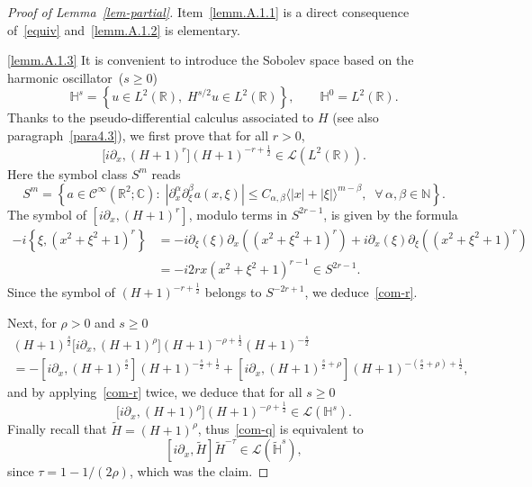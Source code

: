 \documentclass[AHL,Unicode,published]{cedram}
\newcommand{\C}{\mathbb{C}}
\newcommand{\R}{\mathbb{R}}
\newcommand{\HH}{\mathbb{H}}
\newcommand{\N}{\mathbb{N}}
\newcommand{\clL}{\mathcal{L}}
\newcommand{\clC}{\mathcal{C}}
\newcommand{\wt}{\widetilde}
\newcommand{\<}{\langle}
\renewcommand{\>}{\rangle}
\let\oldforall\forall
\renewcommand*{\forall}{\mathrel{\oldforall}}
\newcommand{\R}{\mathbb{R}}
\begin{document}
\begin{proof}[Proof of Lemma~\ref{lem-partial}]
Item~\eqref{lemm.A.1.1}  is a direct consequence of~\eqref{equiv} and~\eqref{lemm.A.1.2} is elementary.

\eqref{lemm.A.1.3}  It is convenient to introduce the Sobolev space based on the harmonic oscillator~($s\geq 0$)
\[
{\HH}^{s} = \left\{ u\in L^2(\R),\; H^{s/2}u\in L^2(\R)\right\}, \qquad {\HH}^{0} =L^2(\R).
\]
Thanks to the pseudo-differential calculus associated to $H$ (see also paragraph~\ref{para4.3}), we first prove that for all $r>0$,
\begin{equation}\label{com-r}
\big[i \partial_x, (H+1)^r\big] (H+1)^{-r+\frac12} \in \clL\left(L^2(\R)\right).
\end{equation}
Here the symbol class $S^m$ reads
\[
S^m =\left\{ a \in \clC^\infty\left(\R^2; \C\right) : \; \left|\partial_{x}^{\alpha} \partial_{\xi}^{\beta} a(x, \xi)\right|
\leq C_{\alpha,\beta}\langle |x|+|\xi|\rangle^{m-\beta}, \;\; \forall \,
\alpha, \beta \in \N\right\}.
\]
The symbol of $ [i \partial_x, (H+1)^r] $, modulo terms in $S^{2r-1}$, is given by the formula
\begin{align*}
-i \left\{ \xi, \left(x^2 +\xi^2+1\right)^{r} \right\} &=-i\partial_{\xi} (\xi) \partial_{x} \left(\left(x^2 +\xi^2+1\right)^{r} \right)+i\partial_{x} (\xi) \partial_{\xi} \left(\left(x^2 +\xi^2+1\right)^{r} \right) \\
&=-i 2r x \left(x^2 +\xi^2+1\right)^{r-1} \in S^{2r-1}.
\end{align*}
Since the symbol of $ (H+1)^{-r+\frac12} $ belongs to $S^{-2r+1}$, we deduce~\eqref{com-r}.

Next, for $\rho>0$ and $s \geq 0$
\begin{multline*}
(H+1)^{\frac{s}2} \big[i \partial_x, (H+1)^{\rho}\big] (H+1)^{-\rho+\frac12} (H+1)^{-\frac{s}2}
\\
=- \left[i \partial_x, (H+1)^\frac{s}2\right] (H+1)^{-\frac{s}2 +\frac12} +\left[i
\partial_x, (H+1)^{\frac{s}2+\rho}\right] (H+1)^{-\left(\frac{s}2 +\rho\right)+\frac12},
\end{multline*}
and by applying~\eqref{com-r} twice, we deduce that for all $s\geq 0$
\begin{equation}\label{com-q}
\big[i \partial_x, (H+1)^{\rho}\big] (H+1)^{-\rho+\frac12} \in \clL\left({\HH}^{s}\right).
\end{equation}
Finally recall that $\wt{H}=(H+1)^{\rho}$, thus~\eqref{com-q} is equivalent to
\[
\left[i \partial_x, \wt{H}\right] \wt{H}^{- \tau } \in \clL\left(\wt{\HH}^{s}\right),
\]
since $\tau = 1-1/(2 \rho)$, which was the claim.
\end{proof}
\end{document}
